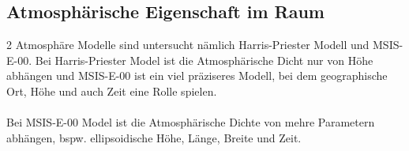 \documentclass{article}
\begin{document}
\subsection{Atmosphärische Eigenschaft im Raum}
2 Atmosphäre Modelle sind untersucht nämlich Harris-Priester Modell \cite{harris1963relation} und MSIS-E-00\cite{picone2002nrlmsise}. Bei Harris-Priester Model ist die Atmosphärische Dicht nur von Höhe abhängen und MSIS-E-00 ist ein viel präziseres Modell, bei dem geographische Ort, Höhe und auch Zeit eine Rolle spielen.
\\\\
Bei MSIS-E-00 Model ist die Atmosphärische Dichte von mehre Parametern abhängen, bspw. ellipsoidische Höhe, Länge, Breite und Zeit.
\begin{figure}[ht]\centering \label{fig:msise00_400km}
\end{figure}
\end{document}
